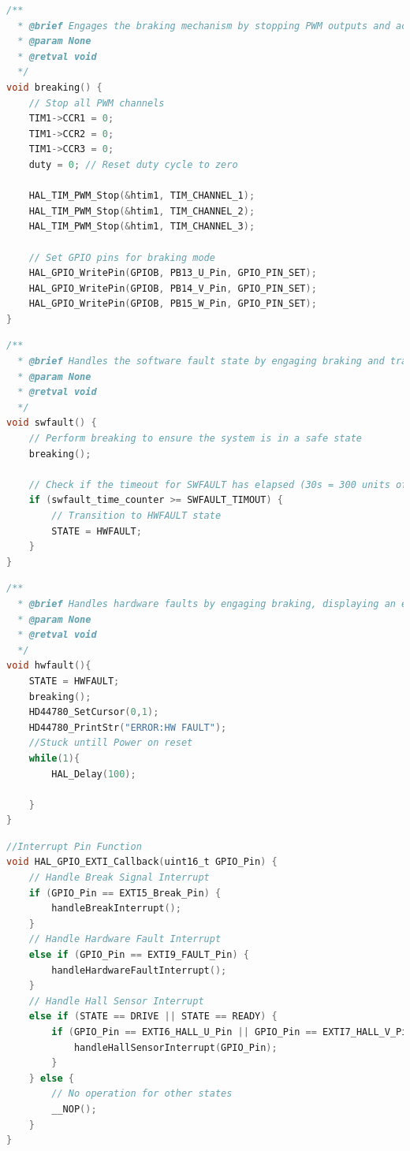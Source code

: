 \documentclass[paper=a4,11pt]{scrreprt}
\begin{document}
\begin{lstlisting}[language=C, caption=\textbf{void breaking()},label={break}, mathescape=true, breaklines=true]
/**
  * @brief Engages the braking mechanism by stopping PWM outputs and activating braking GPIO pins
  * @param None
  * @retval void
  */
void breaking() {
    // Stop all PWM channels
    TIM1->CCR1 = 0;
    TIM1->CCR2 = 0;
    TIM1->CCR3 = 0;
    duty = 0; // Reset duty cycle to zero

    HAL_TIM_PWM_Stop(&htim1, TIM_CHANNEL_1);
    HAL_TIM_PWM_Stop(&htim1, TIM_CHANNEL_2);
    HAL_TIM_PWM_Stop(&htim1, TIM_CHANNEL_3);

    // Set GPIO pins for braking mode
    HAL_GPIO_WritePin(GPIOB, PB13_U_Pin, GPIO_PIN_SET);
    HAL_GPIO_WritePin(GPIOB, PB14_V_Pin, GPIO_PIN_SET);
    HAL_GPIO_WritePin(GPIOB, PB15_W_Pin, GPIO_PIN_SET);
}
\end{lstlisting}
\newpage
\begin{lstlisting}[language=C, caption=\textbf{void swfault()},label={swfault}, mathescape=true, breaklines=true]
/**
  * @brief Handles the software fault state by engaging braking and transitioning to HWFAULT after a timeout
  * @param None
  * @retval void
  */
void swfault() {
    // Perform breaking to ensure the system is in a safe state
    breaking();

    // Check if the timeout for SWFAULT has elapsed (30s = 300 units of 100ms)
    if (swfault_time_counter >= SWFAULT_TIMOUT) {
        // Transition to HWFAULT state
        STATE = HWFAULT;
    }
}
\end{lstlisting}
\begin{lstlisting}[language=C, caption=\textbf{void hwfault()},label={hwfault}, mathescape=true, breaklines=true]
/**
  * @brief Handles hardware faults by engaging braking, displaying an error message, and halting execution
  * @param None
  * @retval void
  */
void hwfault(){
	STATE = HWFAULT;
	breaking();
	HD44780_SetCursor(0,1);
	HD44780_PrintStr("ERROR:HW FAULT");
	//Stuck untill Power on reset
	while(1){
		HAL_Delay(100);

	}
}
\end{lstlisting}
\newpage
\begin{lstlisting}[language=C, caption=\textbf{void HAL\_GPIO\_EXTI\_Callback(uint16\_t GPIO\_Pin)},label={interrupt}, mathescape=true, breaklines=true]
//Interrupt Pin Function
void HAL_GPIO_EXTI_Callback(uint16_t GPIO_Pin) {
    // Handle Break Signal Interrupt
    if (GPIO_Pin == EXTI5_Break_Pin) {
    	handleBreakInterrupt();
    }
    // Handle Hardware Fault Interrupt
    else if (GPIO_Pin == EXTI9_FAULT_Pin) {
    	handleHardwareFaultInterrupt();
    }
    // Handle Hall Sensor Interrupt
    else if (STATE == DRIVE || STATE == READY) {
        if (GPIO_Pin == EXTI6_HALL_U_Pin || GPIO_Pin == EXTI7_HALL_V_Pin || GPIO_Pin == EXTI8_HALL_W_Pin) {
        	handleHallSensorInterrupt(GPIO_Pin);
        }
    } else {
        // No operation for other states
        __NOP();
    }
}
\end{lstlisting}
\end{document}
